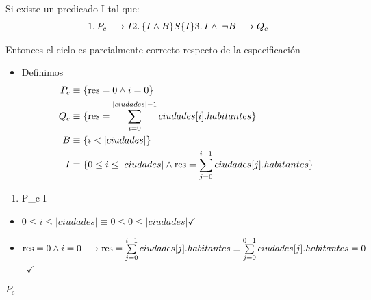 \documentclass[10pt,a4paper]{article}
\begin{document}
Si existe un predicado I tal que:
\begin{equation}
\begin{aligned}
	
	1. \, P_{c} \implica I 
	
	2. \, \{I \wedge B\} S \{I\}
	
	
	3. \, I \wedge \; \neg B \implica Q_{c}
\end{aligned}
\end{equation}

Entonces el ciclo es parcialmente correcto respecto de la especificación

\vspace{0.3cm}
\begin{itemize}

\item{Definimos}
\begin{align}
	
	P_{c} &\equiv \{ \text{res} = 0 \wedge i=0 \} \\
	\vspace{0.1cm}
	Q_{c} &\equiv \{ \text{res} = \sum_{i=0}^{|ciudades|-1} ciudades[i].habitantes \} \\
	\vspace{0.1cm}
	B &\equiv \{i < |ciudades| \} \\
	\vspace{0.1cm}
	I &\equiv \{ 0 \leq i \leq |ciudades| \land \text{res} = \sum\limits_{j=0}^{i-1}ciudades[j].habitantes \} 
	
	
\end{align}
\end{itemize}


\begin{enumerate}
\item P_{c} \implica I
\end{enumerate}
\begin{itemize}
\item $0 \leq i \leq |ciudades| \equiv 0 \leq 0 \leq |ciudades| \checkmark$
\item $\text{res} = 0 \land i = 0 \longrightarrow \text{res} = \sum\limits_{j=0}^{i-1}ciudades[j].habitantes \equiv \sum\limits_{j=0}^{0-1}ciudades[j].habitantes = 0$\ $\checkmark$
\end{itemize}




$P_{c}$ \implica {}

\vspace{0.3cm}
\end{document}
